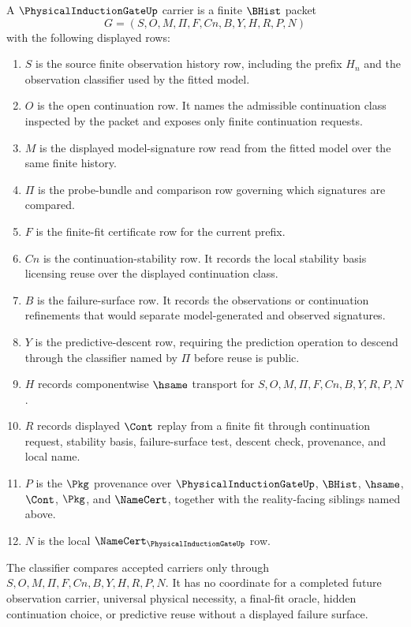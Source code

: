 \begin{definition}
\label{def:physical-induction-gate-carrier}
A $\PhysicalInductionGateUp$ carrier is a finite $\BHist$ packet
$$
G=(S,O,M,\Pi,F,Cn,B,Y,H,R,P,N)
$$
with the following displayed rows:
\begin{enumerate}
\item $S$ is the source finite observation history row, including the prefix $H_n$ and the observation classifier used by the fitted model.
\item $O$ is the open continuation row. It names the admissible continuation class inspected by the packet and exposes only finite continuation requests.
\item $M$ is the displayed model-signature row read from the fitted model over the same finite history.
\item $\Pi$ is the probe-bundle and comparison row governing which signatures are compared.
\item $F$ is the finite-fit certificate row for the current prefix.
\item $Cn$ is the continuation-stability row. It records the local stability basis licensing reuse over the displayed continuation class.
\item $B$ is the failure-surface row. It records the observations or continuation refinements that would separate model-generated and observed signatures.
\item $Y$ is the predictive-descent row, requiring the prediction operation to descend through the classifier named by $\Pi$ before reuse is public.
\item $H$ records componentwise $\hsame$ transport for $S,O,M,\Pi,F,Cn,B,Y,R,P,N$.
\item $R$ records displayed $\Cont$ replay from a finite fit through continuation request, stability basis, failure-surface test, descent check, provenance, and local name.
\item $P$ is the $\Pkg$ provenance over $\PhysicalInductionGateUp$, $\BHist$, $\hsame$, $\Cont$, $\Pkg$, and $\NameCert$, together with the reality-facing siblings named above.
\item $N$ is the local $\NameCert_{\PhysicalInductionGateUp}$ row.
\end{enumerate}
The classifier compares accepted carriers only through $S,O,M,\Pi,F,Cn,B,Y,H,R,P,N$. It has no coordinate for a completed future observation carrier, universal physical necessity, a final-fit oracle, hidden continuation choice, or predictive reuse without a displayed failure surface.
\end{definition}

